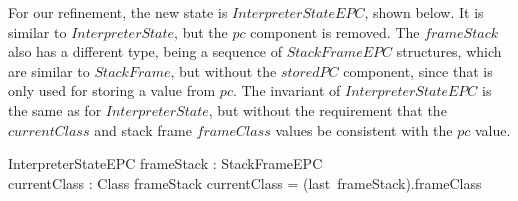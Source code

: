 For our refinement, the new state is $InterpreterStateEPC$, shown
below.
It is similar to $InterpreterState$, but the $pc$ component is
removed.
The $frameStack$ also has a different type, being a sequence of
$StackFrameEPC$ structures, which are similar to $StackFrame$, but
without the $storedPC$ component, since that is only used for storing
a value from $pc$.
The invariant of $InterpreterStateEPC$ is the same as for
$InterpreterState$, but without the requirement that the
$currentClass$ and stack frame $frameClass$ values be consistent with
the $pc$ value.
\begin{schema}{InterpreterStateEPC}
  frameStack : \seq StackFrameEPC \\
  currentClass : Class
\where
  frameStack \neq \emptyset \implies currentClass = (last~frameStack).frameClass
\end{schema}


